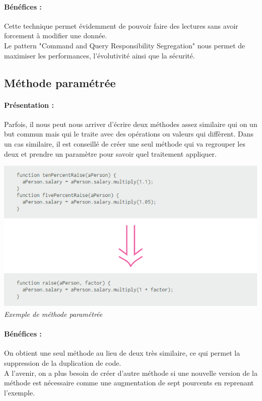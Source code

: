 \documentclass[a4paper,twoside,12pt,openright]{report}
\begin{document}
\paragraph{Bénéfices :}
Cette technique permet évidemment de pouvoir faire des lectures sans avoir forcement à modifier une donnée.\\
Le pattern "Command and Query Responsibility Segregation" nous permet de maximiser les performances, l'évolutivité ainsi que la sécurité.\\

\subsection{Méthode paramétrée}
\paragraph{Présentation :}
Parfois, il nous peut nous arriver d'écrire deux méthodes assez similaire qui on un but commun mais qui le traite avec des opérations ou valeurs qui diffèrent. Dans un cas similaire, il est conseillé de créer une seul méthode qui va regrouper les deux et prendre un paramètre pour savoir quel traitement appliquer.\\

\begin{center}
\includegraphics[scale=1]{Image/Methode_Parametre.png}\\
\itshape{Exemple de méthode paramétrée \cite{ref8}}
\end{center}

\paragraph{Bénéfices :}
On obtient une seul méthode au lieu de deux très similaire, ce qui permet la suppression de la duplication de code.\\
A l'avenir, on a plus besoin de créer d'autre méthode si une nouvelle version de la méthode est nécessaire comme une augmentation de sept pourcents en reprenant l'exemple.\\
\end{document}

